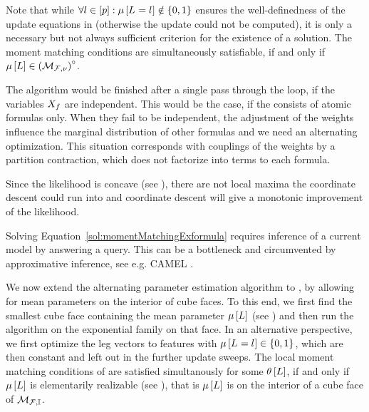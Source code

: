Note that while $\forall{l\in[p]}:{\mu\left[L_{}=l_{}\right]\notin\{0,1\}}$ ensures the well-definedness of the update equations in  (otherwise the update could not be computed), it is only a necessary but not always sufficient criterion for the existence of a solution.
The moment matching conditions are simultaneously satisfiable, if and only if $\mu\left[L\right]\in{\left(\mathcal{M}_{\mathcal{F},\nu}\right)}^{\circ}$.


The algorithm would be finished after a single pass through the loop, if the variables $X_{f}$ are independent.
This would be the case, if the \MarkovLogicNetwork{} consists of atomic formulas only.
When they fail to be independent, the adjustment of the weights influence the marginal distribution of other formulas and we need an alternating optimization.
%
This situation corresponds with couplings of the weights by a partition contraction, which does not factorize into terms to each formula.

Since the likelihood is concave (see \cite{koller_probabilistic_2009}), there are not local maxima the coordinate descent could run into and coordinate descent will give a monotonic improvement of the likelihood.

Solving Equation~\ref{sol:momentMatchingExformula} requires inference of a current model by answering a query.
This can be a bottleneck and circumvented by approximative inference, see e.g. CAMEL \cite{ganapathi_constrained_2008}.

\subsubsect{\HybridLogicNetworks{}}

We now extend the alternating parameter estimation algorithm to \HybridLogicNetworks{}, by allowing for mean parameters on the interior of cube faces.
To this end, we first find the smallest cube face containing the mean parameter $\mu\left[L\right]$ (see ) and then run the algorithm on the exponential family on that face.
In an alternative perspective, we first optimize the leg vectors to features with $\mu\left[L_{}=l_{}\right]\in\{0,1\}$, which are then constant and left out in the further update sweeps.
The local moment matching conditions of are satisfied simultanously for some $\theta\left[L\right]$, if and only if $\mu\left[L\right]$ is elementarily realizable (see ), that is $\mu\left[L\right]$ is on the interior of a cube face of $\mathcal{M}_{\mathcal{F},\mathbb{I}}$.

